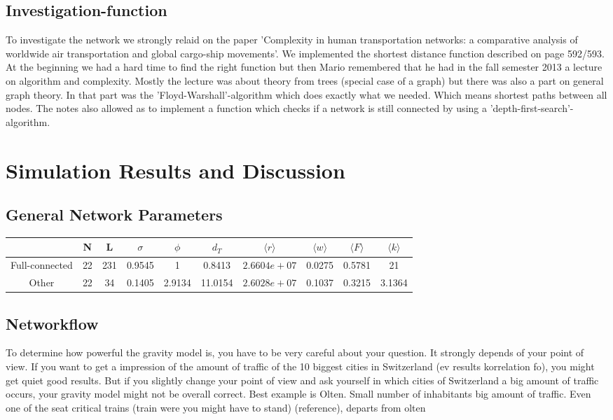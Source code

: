 \documentclass[11pt]{article}
\begin{document}
\subsection{Investigation-function}
To investigate the network we strongly relaid on the paper 'Complexity in human transportation networks: a comparative analysis of worldwide air transportation and global cargo-ship movements'.
We implemented the shortest distance function described on page 592/593. At the beginning we had a hard time to find the right function but then Mario remembered that he had in the fall semester 2013 a lecture on algorithm and complexity. Mostly the lecture was about theory from trees (special case of a graph) but there was also a part on general graph theory. In that part was the 'Floyd-Warshall'-algorithm which does exactly what we needed. Which means shortest paths between all nodes.
The notes also allowed as to implement a function which checks if a network is still connected by using a 'depth-first-search'-algorithm.




\section{Simulation Results and Discussion}

\subsection{General Network Parameters}
\begin{tabular}{c|c|c|c|c|c|c|c|c|c|}
 & N & L & $\sigma$ & $\phi$ & $d_T$ & $\langle r\rangle$ & 
 $\langle w\rangle$ & $\langle F\rangle$&$\langle k\rangle$ \\\hline
 Full-connected & 22 & 231 &0.9545&1& 0.8413& $2.6604e+07$&0.0275&0.5781& 21\\\hline
 
 Other & 22 & 34 &    0.1405&2.9134& 11.0154&$2.6028e+07$&0.1037&0.3215& 3.1364\\\hline
\end{tabular}


\subsection{Networkflow}

To determine how powerful the gravity model is, you have to be very careful about your question. It strongly depends of your point of view. If you want to get a impression of the amount of traffic of the 10 biggest cities in Switzerland (ev results korrelation fo), you might get quiet good results. But if you slightly change your point of view and ask yourself in which cities of Switzerland a big amount of traffic occurs, your gravity model might not be overall correct. Best example is Olten. Small number of inhabitants big amount of traffic. Even one of the seat critical trains (train were you might have to stand) (reference), departs from olten
\end{document}
